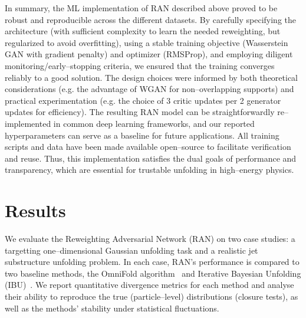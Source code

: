     In summary, the ML implementation of RAN described above proved to be robust and reproducible across the different datasets.
    By carefully specifying the architecture (with sufficient complexity to learn the needed reweighting, but regularized to avoid overfitting), using a stable training objective (Wasserstein GAN with gradient penalty) and optimizer (RMSProp), and employing diligent monitoring/early--stopping criteria, we ensured that the training converges reliably to a good solution.
    The design choices were informed by both theoretical considerations (e.g. the advantage of WGAN for non--overlapping supports) and practical experimentation (e.g. the choice of 3 critic updates per 2 generator updates for efficiency).
    The resulting RAN model can be straightforwardly re--implemented in common deep learning frameworks, and our reported hyperparameters can serve as a baseline for future applications.
    All training scripts and data have been made available open--source to facilitate verification and reuse.
    Thus, this implementation satisfies the dual goals of performance and transparency, which are essential for trustable unfolding in high--energy physics.

\section{Results}
    \label{sec:results}
    We evaluate the Reweighting Adversarial Network (RAN) on two case studies: a targetting one--dimensional Gaussian unfolding task and a realistic jet substructure unfolding problem.
    In each case, RAN’s performance is compared to two baseline methods, the OmniFold algorithm~ and Iterative Bayesian Unfolding (IBU)~.
    We report quantitative divergence metrics for each method and analyse their ability to reproduce the true (particle--level) distributions (closure tests), as well as the methods’ stability under statistical fluctuations.

